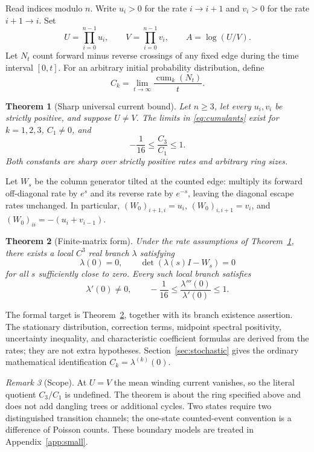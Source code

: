 \documentclass[11pt,a4paper]{article}
\numberwithin{equation}{section}
\newtheorem{theorem}{Theorem}[section]
\theoremstyle{remark}
\newtheorem{remark}[theorem]{Remark}
\newcommand{\Id}{I}
\newcommand{\cum}{\operatorname{cum}}
\begin{document}
Read indices modulo $n$. Write $u_i>0$ for the rate $i\to i+1$ and $v_i>0$
for the rate $i+1\to i$. Set
\begin{equation}\label{eq:UV}
  U=\prod_{i=0}^{n-1}u_i,\qquad
  V=\prod_{i=0}^{n-1}v_i,\qquad
  A=\log(U/V).
\end{equation}
Let $N_t$ count forward minus reverse crossings of any fixed edge during
the time interval $[0,t]$. For an arbitrary initial probability distribution,
define
\begin{equation}\label{eq:cumulants}
  C_k=\lim_{t\to\infty}\frac{\cum_k(N_t)}{t}.
\end{equation}

\begin{theorem}[Sharp universal current bound]\label{thm:main}
Let $n\ge3$, let every $u_i,v_i$ be strictly positive, and suppose $U\ne V$.
The limits in \eqref{eq:cumulants} exist for $k=1,2,3$, $C_1\ne0$, and
\[
  \boxed{\displaystyle -\frac1{16}\le\frac{C_3}{C_1}\le1.}
\]
Both constants are sharp over strictly positive rates and arbitrary ring
sizes.
\end{theorem}

Let $W_s$ be the column generator tilted at the counted edge: multiply its
forward off-diagonal rate by $e^s$ and its reverse rate by $e^{-s}$, leaving
the diagonal escape rates unchanged. In particular,
$(W_0)_{i+1,i}=u_i$, $(W_0)_{i,i+1}=v_i$, and
$(W_0)_{ii}=-(u_i+v_{i-1})$.

\begin{theorem}[Finite-matrix form]\label{thm:matrix}
Under the rate assumptions of Theorem~\ref{thm:main}, there exists a local
$C^3$ real branch $\lambda$ satisfying
\[
  \lambda(0)=0,\qquad \det(\lambda(s)\Id-W_s)=0
\]
for all $s$ sufficiently close to zero. Every such local branch satisfies
\[
  \lambda'(0)\ne0,\qquad
  -\frac1{16}\le\frac{\lambda'''(0)}{\lambda'(0)}\le1.
\]
\end{theorem}

The formal target is Theorem~\ref{thm:matrix}, together with its branch
existence assertion. The stationary distribution, correction terms,
midpoint spectral positivity, uncertainty inequality, and characteristic
coefficient formulas are derived from the rates; they are not extra
hypotheses. Section~\ref{sec:stochastic} gives the ordinary mathematical
identification $C_k=\lambda^{(k)}(0)$.

\begin{remark}[Scope]
At $U=V$ the mean winding current vanishes, so the literal quotient
$C_3/C_1$ is undefined. The theorem is about the ring specified above and
does not add dangling trees or additional cycles. Two states require two
distinguished transition channels; the one-state counted-event convention
is a difference of Poisson counts. These boundary models are treated in
Appendix~\ref{app:small}.
\end{remark}
\end{document}
